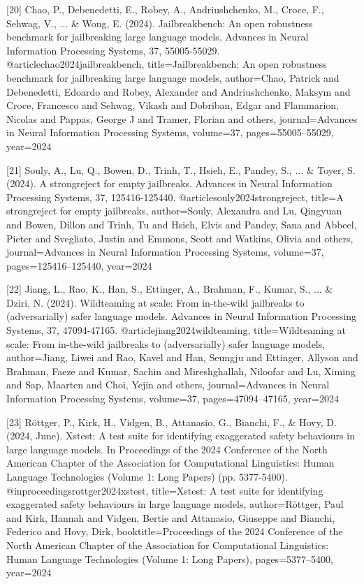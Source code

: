 \documentclass{article}
\begin{document}
{[20] Chao, P., Debenedetti, E., Robey, A., Andriushchenko, M., Croce, F., Sehwag, V., ... & Wong, E. (2024). Jailbreakbench: An open robustness benchmark for jailbreaking large language models. Advances in Neural Information Processing Systems, 37, 55005-55029.
@article{chao2024jailbreakbench,
  title={Jailbreakbench: An open robustness benchmark for jailbreaking large language models},
  author={Chao, Patrick and Debenedetti, Edoardo and Robey, Alexander and Andriushchenko, Maksym and Croce, Francesco and Sehwag, Vikash and Dobriban, Edgar and Flammarion, Nicolas and Pappas, George J and Tramer, Florian and others},
  journal={Advances in Neural Information Processing Systems},
  volume={37},
  pages={55005--55029},
  year={2024}
}

[21] Souly, A., Lu, Q., Bowen, D., Trinh, T., Hsieh, E., Pandey, S., ... & Toyer, S. (2024). A strongreject for empty jailbreaks. Advances in Neural Information Processing Systems, 37, 125416-125440.
@article{souly2024strongreject,
  title={A strongreject for empty jailbreaks},
  author={Souly, Alexandra and Lu, Qingyuan and Bowen, Dillon and Trinh, Tu and Hsieh, Elvis and Pandey, Sana and Abbeel, Pieter and Svegliato, Justin and Emmons, Scott and Watkins, Olivia and others},
  journal={Advances in Neural Information Processing Systems},
  volume={37},
  pages={125416--125440},
  year={2024}
}

[22] Jiang, L., Rao, K., Han, S., Ettinger, A., Brahman, F., Kumar, S., ... & Dziri, N. (2024). Wildteaming at scale: From in-the-wild jailbreaks to (adversarially) safer language models. Advances in Neural Information Processing Systems, 37, 47094-47165.
@article{jiang2024wildteaming,
  title={Wildteaming at scale: From in-the-wild jailbreaks to (adversarially) safer language models},
  author={Jiang, Liwei and Rao, Kavel and Han, Seungju and Ettinger, Allyson and Brahman, Faeze and Kumar, Sachin and Mireshghallah, Niloofar and Lu, Ximing and Sap, Maarten and Choi, Yejin and others},
  journal={Advances in Neural Information Processing Systems},
  volume={37},
  pages={47094--47165},
  year={2024}
}

[23] Röttger, P., Kirk, H., Vidgen, B., Attanasio, G., Bianchi, F., & Hovy, D. (2024, June). Xstest: A test suite for identifying exaggerated safety behaviours in large language models. In Proceedings of the 2024 Conference of the North American Chapter of the Association for Computational Linguistics: Human Language Technologies (Volume 1: Long Papers) (pp. 5377-5400).
@inproceedings{rottger2024xstest,
  title={Xstest: A test suite for identifying exaggerated safety behaviours in large language models},
  author={R{\"o}ttger, Paul and Kirk, Hannah and Vidgen, Bertie and Attanasio, Giuseppe and Bianchi, Federico and Hovy, Dirk},
  booktitle={Proceedings of the 2024 Conference of the North American Chapter of the Association for Computational Linguistics: Human Language Technologies (Volume 1: Long Papers)},
  pages={5377--5400},
  year={2024}
}

}
\end{document}
